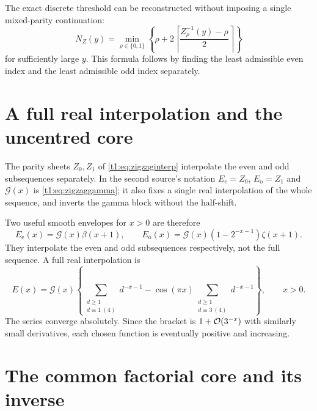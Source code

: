 \documentclass[11pt,openany]{book}
\numberwithin{equation}{chapter}
\theoremstyle{plain}
\theoremstyle{definition}
\theoremstyle{remark}
\begin{document}
The exact discrete threshold can be reconstructed without imposing a single mixed-parity continuation:
\begin{equation}
 N_Z(y)=\min_{\rho\in\{0,1\}}
 \left\{\rho+2\left\lceil\frac{Z_\rho^{-1}(y)-\rho}{2}\right\rceil\right\}
 \label{t1:eq:zigzagthreshold}
\end{equation}
for sufficiently large $y$. This formula follows by finding the least admissible even index and the least admissible odd index separately.

\section{A full real interpolation and the uncentred core}
\label{ct:sec:zigzag-full}

The parity sheets $Z_0,Z_1$ of \cref{t1:eq:zigzaginterp} interpolate the even
and odd subsequences separately.  In the second source's notation
$E_{\mathrm e}=Z_0$, $E_{\mathrm o}=Z_1$ and $\mathcal G(x)$ is
\cref{t1:eq:zigzaggamma}; it also fixes a single real interpolation of the
whole sequence, and inverts the gamma block without the half-shift.

Two useful smooth envelopes for $x>0$ are therefore
\begin{equation}
 E_{\mathrm e}(x)=\mathcal G(x)\beta(x+1),\qquad
 E_{\mathrm o}(x)=\mathcal G(x)(1-2^{-x-1})\zeta(x+1).
 \label{t2:eq:zigzag-envelopes}
\end{equation}
They interpolate the even and odd subsequences respectively, not the full sequence. A full real interpolation is
\begin{equation}
 E(x)=\mathcal G(x)\left\{
 \sum_{\substack{d\ge1\\d\equiv1\ (4)}}d^{-x-1}
 -\cos(\pi x)\sum_{\substack{d\ge1\\d\equiv3\ (4)}}d^{-x-1}
 \right\},\qquad x>0.
 \label{t2:eq:zigzag-cont}
\end{equation}
The series converge absolutely. Since the bracket is $1+\mathcal O(3^{-x})$ with similarly small derivatives, each chosen function is eventually positive and increasing.
\section{The common factorial core and its inverse}
\end{document}
